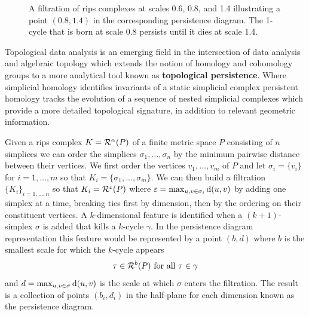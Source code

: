 \begin{figure}[htbp]
    \caption{A filtration of rips complexes at scales 0.6, 0.8, and 1.4 illustrating a point $(0.8, 1.4)$ in the corresponding persistence diagram. The 1-cycle that is born at scale 0.8 persists until it dies at scale 1.4.}
    \label{fig:persist}
\end{figure}

Topological data analysis is an emerging field in the intersection of data analysis and algebraic topology which extends the notion of homology and cohomology groups to a more analytical tool known as \textbf{topological persistence}.
Where simplicial homology identifies invariants of a static simplicial complex persistent homology tracks the evolution of a sequence of nested simplicial complexes which provide a more detailed topological signature, in addition to relevant geometric information.

Given a rips complex $K = \mathcal{R}^\alpha(P)$ of a finite metric space $P$ consisting of $n$ simplices we can order the simplices $\sigma_1,\ldots,\sigma_n$ by the minimum pairwise distance between their vertices.
We first order the vertices $v_1,\ldots,v_m$ of $P$ and let $\sigma_i = \{v_i\}$ for $i=1,\ldots,m$ so that $K_i = \{\sigma_1,\ldots, \sigma_m\}$.
We can then build a filtration $\{K_i\}_{i=1,\ldots,n}$ so that $K_i = \mathcal{R}^\varepsilon(P)$ where $\varepsilon = \max_{u,v\in\sigma_i}\mathrm{d}(u,v)$ by adding one simplex at a time, breaking ties first by dimension, then by the ordering on their constituent vertices.
A $k$-dimensional feature is identified when a $(k+1)$-simplex $\sigma$ is added that kills a $k$-cycle $\gamma$.
In the persistence diagram representation this feature would be represented by a point $(b, d)$ where $b$ is the smallest scale for which the $k$-cycle appears
\[ \tau\in\mathcal{R}^b(P)\text{ for all }\tau\in\gamma\]
and $d = \max_{u,v\in\sigma}\mathrm{d}(u,v)$ is the scale at which $\sigma$ enters the filtration.
The result is a collection of points $(b_i, d_i)$ in the half-plane for each dimension known as the persistence diagram.

